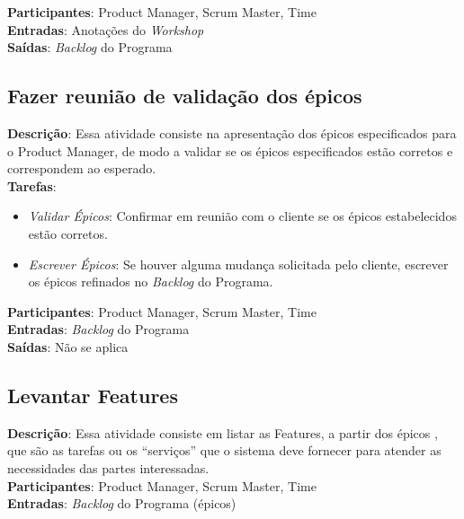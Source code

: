   \textbf{Participantes}: Product Manager, Scrum Master, Time \\
  
  \textbf{Entradas}: Anotações do \textit{Workshop} \\
  
  \textbf{Saídas}: \textit{Backlog} do Programa \\

\subsection{Fazer reunião de validação dos épicos}
  \textbf{Descrição}: Essa atividade consiste na apresentação dos épicos especificados para o Product Manager, de modo a validar se os épicos 
  especificados estão corretos e correspondem ao esperado. \\
  
  \textbf{Tarefas}: 
  
  \begin{itemize}
    \item \indent \textit{Validar Épicos}: Confirmar em reunião com o cliente se os épicos estabelecidos estão corretos.
   
   \item \indent \textit{Escrever Épicos}: Se houver alguma mudança solicitada pelo cliente, escrever os épicos 
   refinados no \textit{Backlog} do Programa.
  \end{itemize}
 
  \textbf{Participantes}: Product Manager, Scrum Master, Time \\
  
  \textbf{Entradas}: \textit{Backlog} do Programa \\
  
  \textbf{Saídas}:  Não se aplica\\

\subsection{Levantar Features}
\textbf{Descrição}: Essa atividade consiste em listar as Features, a partir dos épicos , 
que são as tarefas ou os “serviços” que o sistema deve fornecer para atender as necessidades das partes interessadas. \\

\textbf{Participantes}: Product Manager, Scrum Master, Time \\

\textbf{Entradas}: \textit{Backlog} do Programa (épicos) \\

